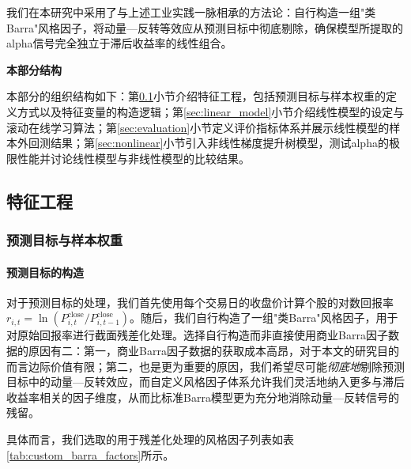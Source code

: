 \documentclass{article}
\begin{document}
我们在本研究中采用了与上述工业实践一脉相承的方法论：自行构造一组"类Barra"风格因子，将动量—反转等效应从预测目标中彻底剔除，确保模型所提取的alpha信号完全独立于滞后收益率的线性组合。

\vspace{0.5em}
\noindent\textbf{本部分结构}

本部分的组织结构如下：第\ref{sec:feature_engineering}小节介绍特征工程，包括预测目标与样本权重的定义方式以及特征变量的构造逻辑；第\ref{sec:linear_model}小节介绍线性模型的设定与滚动在线学习算法；第\ref{sec:evaluation}小节定义评价指标体系并展示线性模型的样本外回测结果；第\ref{sec:nonlinear}小节引入非线性梯度提升树模型，测试alpha的极限性能并讨论线性模型与非线性模型的比较结果。

\subsection{特征工程}
\label{sec:feature_engineering}

\subsubsection{预测目标与样本权重}
\label{sec:target_weight}

\paragraph{预测目标的构造}

对于预测目标的处理，我们首先使用每个交易日的收盘价计算个股的对数回报率 $r_{i,t} = \ln(P_{i,t}^{\text{close}}/P_{i,t-1}^{\text{close}})$。随后，我们自行构造了一组"类Barra"风格因子，用于对原始回报率进行截面残差化处理。选择自行构造而非直接使用商业Barra因子数据的原因有二：第一，商业Barra因子数据的获取成本高昂，对于本文的研究目的而言边际价值有限；第二，也是更为重要的原因，我们希望尽可能\textit{彻底地}剔除预测目标中的动量—反转效应，而自定义风格因子体系允许我们灵活地纳入更多与滞后收益率相关的因子维度，从而比标准Barra模型更为充分地消除动量—反转信号的残留。

具体而言，我们选取的用于残差化处理的风格因子列表如表\ref{tab:custom_barra_factors}所示。
\end{document}
